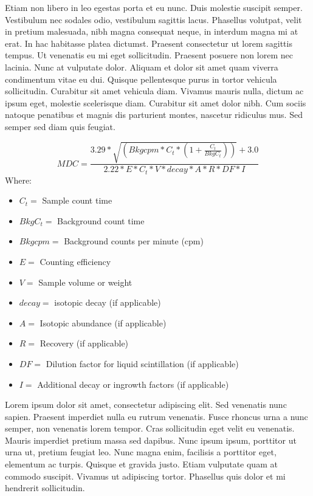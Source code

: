 \documentclass[double,12pt]{beavtex}
\begin{document}
Etiam non libero in leo egestas porta et eu nunc. Duis molestie suscipit semper. Vestibulum nec sodales odio, vestibulum sagittis lacus. Phasellus volutpat, velit in pretium malesuada, nibh magna consequat neque, in interdum magna mi at erat. In hac habitasse platea dictumst. Praesent consectetur ut lorem sagittis tempus. Ut venenatis eu mi eget sollicitudin. Praesent posuere non lorem nec lacinia. Nunc at vulputate dolor. Aliquam et dolor sit amet quam viverra condimentum vitae eu dui. Quisque pellentesque purus in tortor vehicula sollicitudin. Curabitur sit amet vehicula diam. Vivamus mauris nulla, dictum ac ipsum eget, molestie scelerisque diam. Curabitur sit amet dolor nibh. Cum sociis natoque penatibus et magnis dis parturient montes, nascetur ridiculus mus. Sed semper sed diam quis feugiat. 


\begin{equation}
MDC=\frac{3.29*\sqrt{(Bkgcpm*C_{t}*(1+\frac{C_{t}}{BkgC_{t}}))}+3.0}{2.22*E*C_{t}*V*decay*A*R*DF*I}
\label{eq:mdc}
\end{equation}
Where:

\begin{itemize}
\item $C_{t} =$ Sample count time
\item $BkgC_{t} =$ Background count time
\item $Bkgcpm =$ Background counts per minute (cpm)
\item $E =$ Counting efficiency
\item $V =$ Sample volume or weight
\item $decay =$ isotopic decay (if applicable)
\item $A =$ Isotopic abundance (if applicable)
\item $R =$ Recovery (if applicable)
\item $DF =$ Dilution factor for liquid scintillation (if applicable)
\item $I =$ Additional decay or ingrowth factors (if applicable)
\end{itemize}

Lorem ipsum dolor sit amet, consectetur adipiscing elit. Sed venenatis nunc sapien. Praesent imperdiet nulla eu rutrum venenatis. Fusce rhoncus urna a nunc semper, non venenatis lorem tempor. Cras sollicitudin eget velit eu venenatis. Mauris imperdiet pretium massa sed dapibus. Nunc ipsum ipsum, porttitor ut urna ut, pretium feugiat leo. Nunc magna enim, facilisis a porttitor eget, elementum ac turpis. Quisque et gravida justo. Etiam vulputate quam at commodo suscipit. Vivamus ut adipiscing tortor. Phasellus quis dolor et mi hendrerit sollicitudin. 
\end{document}
